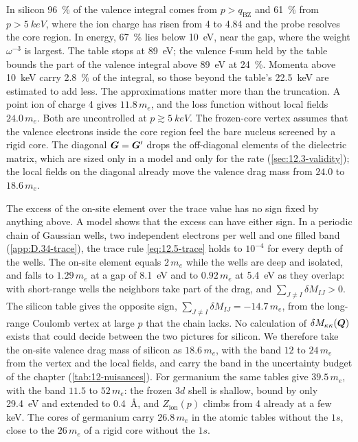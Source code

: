 In silicon \SI{96}{\percent} of the valence integral comes from $p > q_{\mathrm{BZ}}$ and \SI{61}{\percent} from $p > \SI{5}{keV}$, where the ion charge has risen from 4 to 4.84 and the probe resolves the core region. In energy, \SI{67}{\percent} lies below \SI{10}{eV}, near the gap, where the weight $\omega^{-3}$ is largest. The table stops at \SI{89}{eV}; the valence f-sum held by the table bounds the part of the valence integral above \SI{89}{eV} at \SI{24}{\percent}. Momenta above \SI{10}{keV} carry \SI{2.8}{\percent} of the integral, so those beyond the table's \SI{22.5}{keV} are estimated to add less. The approximations matter more than the truncation. A point ion of charge 4 gives $11.8\,m_e$, and the loss function without local fields $24.0\,m_e$. Both are uncontrolled at $p \gtrsim \SI{5}{keV}$. The frozen-core vertex assumes that the valence electrons inside the core region feel the bare nucleus screened by a rigid core. The diagonal $\bm{G} = \bm{G}'$ drops the off-diagonal elements of the dielectric matrix, which are sized only in a model and only for the rate (\cref{sec:12.3-validity}); the local fields on the diagonal already move the valence drag mass from $24.0$ to $18.6\,m_e$.

The excess of the on-site element over the trace value has no sign fixed by anything above. A model shows that the excess can have either sign. In a periodic chain of Gaussian wells, two independent electrons per well and one filled band (\cref{app:D.34-trace}), the trace rule \cref{eq:12.5-trace} holds to $10^{-4}$ for every depth of the wells. The on-site element equals $2\,m_e$ while the wells are deep and isolated, and falls to $1.29\,m_e$ at a gap of \SI{8.1}{eV} and to $0.92\,m_e$ at \SI{5.4}{eV} as they overlap: with short-range wells the neighbors take part of the drag, and $\sum_{J\neq I}\delta M_{IJ} > 0$. The silicon table gives the opposite sign, $\sum_{J\neq I}\delta M_{IJ} = -14.7\,m_e$, from the long-range Coulomb vertex at large $p$ that the chain lacks. No calculation of $\delta M_{\kappa\kappa}(\bm{Q})$ exists that could decide between the two pictures for silicon. We therefore take the on-site valence drag mass of silicon as $18.6\,m_e$, with the band $12$ to $24\,m_e$ from the vertex and the local fields, and carry the band in the uncertainty budget of the chapter (\cref{tab:12-nuisances}). For germanium the same tables give $39.5\,m_e$, with the band $11.5$ to $52\,m_e$: the frozen $3d$ shell is shallow, bound by only \SI{29.4}{eV} and extended to \SI{0.4}{\angstrom}, and $Z_{\mathrm{ion}}(p)$ climbs from 4 already at a few keV. The cores of germanium carry $26.8\,m_e$ in the atomic tables without the $1s$, close to the $26\,m_e$ of a rigid core without the $1s$.

